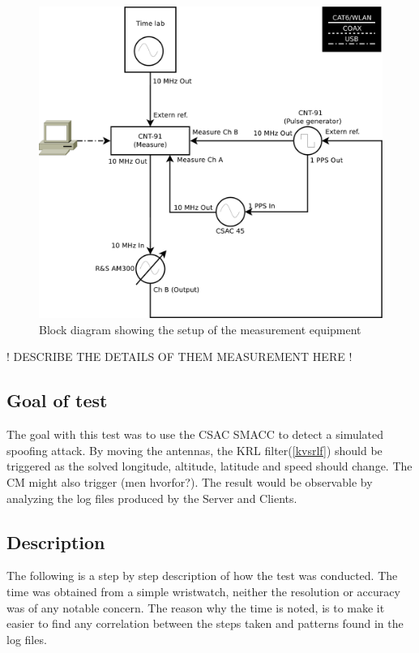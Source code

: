 \documentclass[12pt,english,a4paper]{report}
\begin{document}
\begin{figure}
\centering
  \includegraphics[scale=0.31]{measure_setup.pdf}
   \caption[Measurement setup]{Block diagram showing the setup of the measurement equipment}
   \label{msd}
\end{figure}
! DESCRIBE THE DETAILS OF THEM MEASUREMENT HERE !

\subsection{Goal of test}
The goal with this test was to use the CSAC SMACC to detect a simulated spoofing attack. By moving the antennas, the KRL filter(\ref{kvsrlf}) should be triggered as the solved longitude, altitude, latitude and speed should change. The CM might also trigger (men hvorfor?). The result would be observable by analyzing the log files produced by the Server and Clients.

\subsection{Description}\label{description}
The following is a step by step description of how the test was conducted. The time was obtained from a simple wristwatch, neither the resolution or accuracy was of any notable concern. The reason why the time is noted, is to make it easier to find any correlation between the steps taken and patterns found in the log files.
\end{document}
